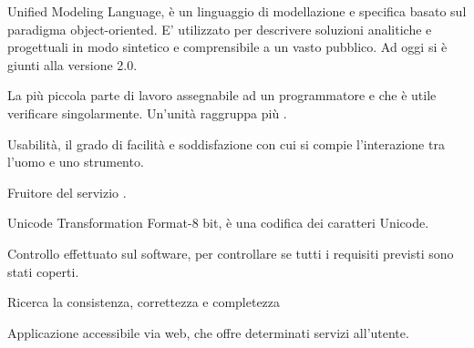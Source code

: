 \begin{itemize}


Unified Modeling Language, è un linguaggio di modellazione e specifica basato sul paradigma object-oriented. 
E' utilizzato per descrivere soluzioni analitiche e progettuali in modo sintetico e comprensibile a un vasto pubblico.
Ad oggi si è giunti alla versione 2.0.


La più piccola parte di lavoro assegnabile ad un programmatore e che è utile verificare singolarmente. Un'unità raggruppa più .

Usabilità, il grado di facilità e soddisfazione con cui si compie l'interazione tra l'uomo e uno strumento.


Fruitore del servizio \ProjectName{}.


Unicode Transformation Format-8 bit, è una codifica dei caratteri Unicode. 

\end{itemize}


\begin{itemize}


Controllo effettuato sul software, per controllare se tutti i requisiti previsti sono stati coperti.


Ricerca la consistenza, correttezza e completezza

\end{itemize}


\begin{itemize}


Applicazione accessibile via web, che offre determinati servizi all'utente.

\end{itemize}


%

